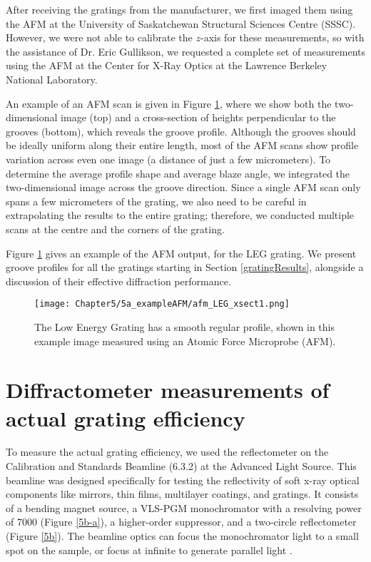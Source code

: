 After receiving the gratings from the manufacturer, we first imaged them using the AFM at the University of Saskatchewan Structural Sciences Centre (SSSC).  However, we were not able to calibrate the $z$-axis for these measurements, so with the assistance of Dr. Eric Gullikson, we requested a complete set of measurements using the AFM at the Center for X-Ray Optics at the Lawrence Berkeley National Laboratory.

An example of an AFM scan is given in Figure \ref{5a}, where we show both the two-dimensional image (top) and a cross-section of heights perpendicular to the grooves (bottom), which reveals the groove profile.  Although the grooves should be ideally uniform along their entire length, most of the AFM scans show profile variation across even one image (a distance of just a few micrometers).  To determine the average profile shape and average blaze angle, we integrated the two-dimensional image across the groove direction.  Since a single AFM scan only spans a few micrometers of the grating, we also need to be careful in extrapolating the results to the entire grating; therefore, we conducted multiple scans at the centre and the corners of the grating.

Figure \ref{5a} gives an example of the AFM output, for the LEG grating.  We present  groove profiles for all the gratings starting in Section \ref{gratingResults}, alongside a discussion of their effective diffraction performance.

\begin{figure}[htbp] %
   \centering
   \texttt{[image: Chapter5/5a\_exampleAFM/afm\_LEG\_xsect1.png]} 
   \caption{The Low Energy Grating has a smooth regular profile, shown in this example image measured using an Atomic Force Microprobe (AFM).}
   \label{5a}
\end{figure}

\section{Diffractometer measurements of actual grating efficiency}
To measure the actual grating efficiency, we used the reflectometer on the Calibration and Standards Beamline (6.3.2) at the Advanced Light Source.  This beamline was designed specifically for testing the reflectivity of soft x-ray optical components like mirrors, thin films, multilayer coatings, and gratings.  It consists of a bending magnet source, a VLS-PGM monochromator with a resolving power of 7000 (Figure \ref{5b-a}), a higher-order suppressor, and a two-circle reflectometer (Figure \ref{5b}).  The beamline optics can focus the monochromator light to a small spot on the sample, or focus at infinite to generate parallel light \cite{Und96}.

